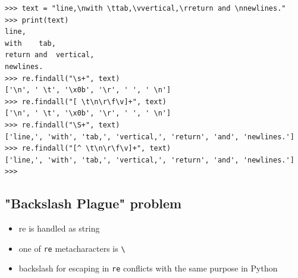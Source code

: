 \documentclass{beamer}
\begin{document}
\begin{frame}[fragile]
\begin{lstlisting}
>>> text = "line,\nwith \ttab,\vvertical,\rreturn and \nnewlines."
>>> print(text)
line,
with    tab,
return and  vertical,
newlines.
>>> re.findall("\s+", text)
['\n', ' \t', '\x0b', '\r', ' ', ' \n']
>>> re.findall("[ \t\n\r\f\v]+", text)
['\n', ' \t', '\x0b', '\r', ' ', ' \n']
>>> re.findall("\S+", text)
['line,', 'with', 'tab,', 'vertical,', 'return', 'and', 'newlines.']
>>> re.findall("[^ \t\n\r\f\v]+", text)
['line,', 'with', 'tab,', 'vertical,', 'return', 'and', 'newlines.']
>>>
\end{lstlisting}
\end{frame}

\subsection{"Backslash Plague" problem}
\begin{frame}[fragile]
\begin{itemize}
\item re is handled as string
\item one of \verb/re/ metacharacters is \verb/\/
\item backslash for escaping in \verb/re/ conflicts with the same purpose in Python
\end{itemize}
\end{frame}
\end{document}
